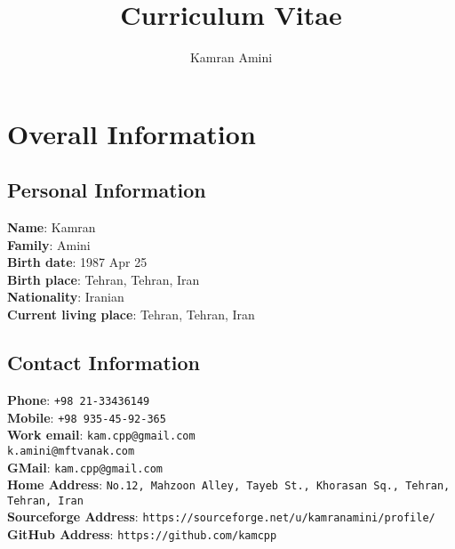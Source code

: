 \documentclass[12pt,a4paper]{article}
\begin{document}
\title{Curriculum Vitae}
\author{Kamran Amini}
\maketitle

\tableofcontents
\newpage

\section{Overall Information}

	\subsection{Personal Information}
		\textbf{Name}: Kamran \\
		\textbf{Family}: Amini \\
		\textbf{Birth date}: 1987 Apr 25 \\
		\textbf{Birth place}: Tehran, Tehran, Iran \\
		\textbf{Nationality}: Iranian \\
		\textbf{Current living place}: Tehran, Tehran, Iran 
			
	\subsection{Contact Information} 
		\textbf{Phone}: \indent \texttt{+98 21-33436149} \\
		\textbf{Mobile}: \indent \texttt{+98 935-45-92-365} \\
		\textbf{Work email}: \indent \texttt{kam.cpp@gmail.com} \\ \indent \indent \indent \indent \indent \texttt{k.amini@mftvanak.com} \\ 
		\textbf{GMail}: \indent \texttt{kam.cpp@gmail.com} \\
    	\textbf{Home Address}: \indent \texttt{No.12, Mahzoon Alley, Tayeb St., Khorasan Sq., Tehran, Tehran, Iran} \\
    	\textbf{Sourceforge Address}: \indent \texttt{https://sourceforge.net/u/kamranamini/profile/}
    	\textbf{GitHub Address}: \indent \texttt{https://github.com/kamcpp} \\
			
\end{document}
